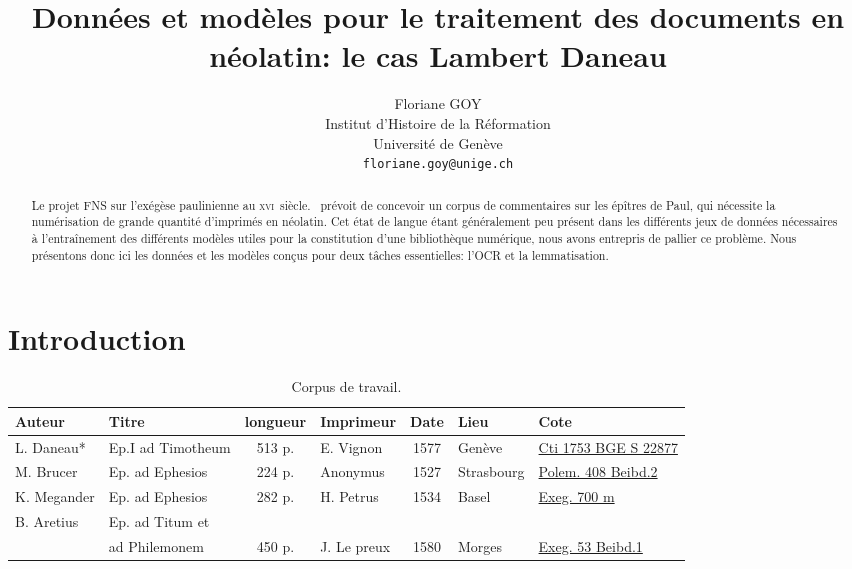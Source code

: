 \documentclass[11pt,french]{article}
\title{Données et modèles pour le traitement des documents en néolatin: le cas Lambert Daneau}
\author{Floriane 
GOY \\
  Institut d'Histoire de la Réformation \\
  Université de Genève \\
  \texttt{floriane.goy@unige.ch}
  }
\begin{document}
\maketitle
\begin{abstract}
Le projet FNS sur l'exégèse paulinienne au \textsc{xvi}\ieme{}~siècle.~\cite{exegesisofPaul_2023} prévoit de concevoir un corpus de commentaires sur les épîtres de Paul, qui nécessite la numérisation de grande quantité d'imprimés en néolatin. Cet état de langue étant généralement peu présent dans les différents jeux de données nécessaires à l'entraînement des différents modèles utiles pour la constitution d'une bibliothèque numérique, nous avons entrepris de pallier ce problème. Nous présentons donc ici les données et les modèles conçus pour deux tâches essentielles: l'OCR et la lemmatisation.
\end{abstract}

\section{Introduction}
\begin{table}[t]
    \centering\small
    \begin{tabular}{l l c l c l l}
        \toprule
        \textbf{Auteur} & \textbf{Titre} & \textbf{longueur} & \textbf{Imprimeur} & \textbf{Date} & \textbf{Lieu} & \textbf{Cote} \\ \midrule
        L. Daneau* & Ep.I ad Timotheum & 513 p. & E. Vignon & 1577 & Genève & \href{https://doi.org/10.3931/e-rara-6338}{Cti 1753 BGE S 22877} \\
        M. Brucer & Ep. ad Ephesios & 224 p. & Anonymus & 1527 & Strasbourg& \href{https://mdz-nbn-resolving.de/urn:nbn:de:bvb:12-bsb00035303-6}{Polem. 408 Beibd.2} \\
        K. Megander & Ep. ad Ephesios & 282 p. & H. Petrus & 1534 & Basel& \href{https://mdz-nbn-resolving.de/urn:nbn:de:bvb:12-bsb00036972-0}{Exeg. 700 m} \\
        B. Aretius & Ep. ad Titum et & & & & & \\
        &  ad Philemonem & 450 p. & J. Le preux & 1580 & Morges & \href{https://mdz-nbn-resolving.de/urn:nbn:de:bvb:12-bsb10313792-3}{Exeg. 53 Beibd.1} \\ \bottomrule
    \end{tabular}
    \caption{Corpus de travail.}
    \label{tab:corpus}
\end{table}
\end{document}
